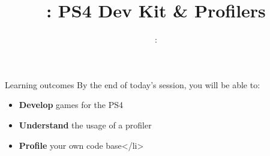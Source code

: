 \usepackage{../../beamerthemeFalmouthGamesAcademy}
\usepackage{multimedia}
\graphicspath{ {../../} }


\usepackage[normalem]{ulem}
\usepackage{wasysym}

\usepackage{pdfpages}

\usetikzlibrary{arrows,automata}




\title{\sessionnumber: PS4 Dev Kit \& Profilers}
\subtitle{\modulecode: \moduletitle}

\frame{\titlepage} 

\begin{frame}{Learning outcomes}
	By the end of today's session, you will be able to:
	\begin{itemize}
		\item \textbf{Develop} games for the PS4
		\item \textbf{Understand} the usage of a profiler
		\item \textbf{Profile} your own code base</li>
	\end{itemize}
\end{frame}







